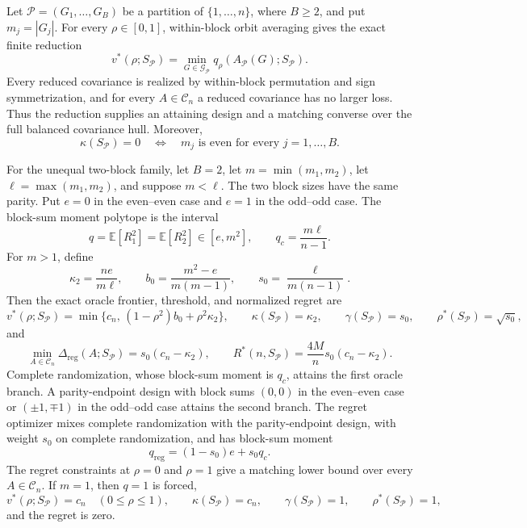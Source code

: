 Let \(\mathcal P=(G_1,\ldots,G_B)\) be a partition of \(\{1,\ldots,n\}\), where \(B\geq2\), and put \(m_j=|G_j|\).  For every \(\rho\in[0,1]\), within-block orbit averaging gives the exact finite reduction
\[
v^*(\rho;S_{\mathcal P})
=\min_{G\in\mathcal G_{\mathcal P}}
q_\rho\!\left(A_{\mathcal P}(G);S_{\mathcal P}\right).
\]
Every reduced covariance is realized by within-block permutation and sign symmetrization, and for every \(A\in\mathcal C_n\) a reduced covariance has no larger loss.  Thus the reduction supplies an attaining design and a matching converse over the full balanced covariance hull.  Moreover,
\[
\kappa(S_{\mathcal P})=0
\quad\Longleftrightarrow\quad
m_j\text{ is even for every }j=1,\ldots,B.
\]

For the unequal two-block family, let \(B=2\), let \(m=\min(m_1,m_2)\), let \(\ell=\max(m_1,m_2)\), and suppose \(m<\ell\).  The two block sizes have the same parity.  Put \(e=0\) in the even--even case and \(e=1\) in the odd--odd case.  The block-sum moment polytope is the interval
\[
q=\mathbb E[R_1^2]=\mathbb E[R_2^2]\in[e,m^2],
\qquad
q_c=\frac{m\ell}{n-1}.
\]
For \(m>1\), define
\[
\kappa_2=\frac{ne}{m\ell},
\qquad
b_0=\frac{m^2-e}{m(m-1)},
\qquad
s_0=\frac{\ell}{m(n-1)}.
\]
Then the exact oracle frontier, threshold, and normalized regret are
\[
v^*(\rho;S_{\mathcal P})
=\min\{c_n,\,(1-\rho^2)b_0+\rho^2\kappa_2\},
\qquad
\kappa(S_{\mathcal P})=\kappa_2,
\qquad
\gamma(S_{\mathcal P})=s_0,
\qquad
\rho^*(S_{\mathcal P})=\sqrt{s_0},
\]
and
\[
\min_{A\in\mathcal C_n}\Delta_{\mathrm{reg}}(A;S_{\mathcal P})
=s_0(c_n-\kappa_2),
\qquad
R^*(n,S_{\mathcal P})
=\frac{4M}{n}s_0(c_n-\kappa_2).
\]
Complete randomization, whose block-sum moment is \(q_c\), attains the first oracle branch.  A parity-endpoint design with block sums \((0,0)\) in the even--even case or \((\pm1,\mp1)\) in the odd--odd case attains the second branch.  The regret optimizer mixes complete randomization with the parity-endpoint design, with weight \(s_0\) on complete randomization, and has block-sum moment
\[
q_{\mathrm{reg}}=(1-s_0)e+s_0q_c.
\]
The regret constraints at \(\rho=0\) and \(\rho=1\) give a matching lower bound over every \(A\in\mathcal C_n\).  If \(m=1\), then \(q=1\) is forced,
\[
v^*(\rho;S_{\mathcal P})=c_n\quad(0\leq\rho\leq1),
\qquad
\kappa(S_{\mathcal P})=c_n,
\qquad
\gamma(S_{\mathcal P})=1,
\qquad
\rho^*(S_{\mathcal P})=1,
\]
and the regret is zero.

